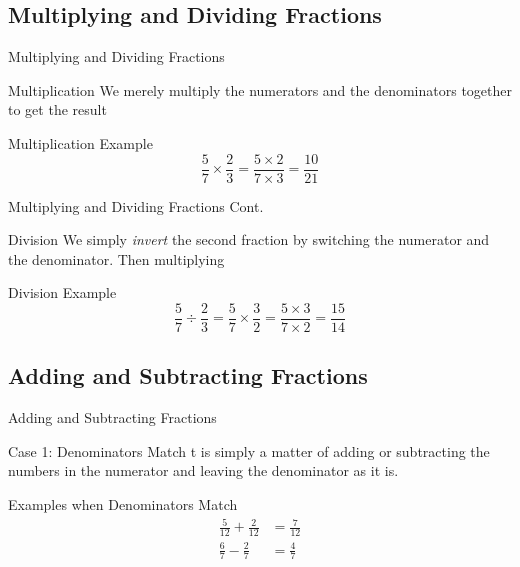\documentclass{beamer}
\begin{document}
\subsection{Multiplying and Dividing Fractions}

\begin{frame}{Multiplying and Dividing Fractions}

\begin{block}{Multiplication}
We merely multiply the numerators and the denominators together to get the result
\end{block}

  \begin{exampleblock}{Multiplication Example}
  $$\frac{5}{7}\times \frac{2}{3} = \frac{5\times 2}{7\times 3} = \frac{10}{21}$$
  \end{exampleblock}
\end{frame}

\begin{frame}{Multiplying and Dividing Fractions Cont.}

\begin{block}{Division}
We simply \textit{invert} the second fraction by switching the numerator and the denominator. Then multiplying
\end{block}

  \begin{exampleblock}{Division Example}
  $$\frac{5}{7}\div \frac{2}{3} = \frac{5}{7}\times \frac{3}{2} = \frac{5\times 3}{7\times 2} = \frac{15}{14}$$
  \end{exampleblock}
\end{frame}

\subsection{Adding and Subtracting Fractions}


\begin{frame}{Adding and Subtracting Fractions}
  \begin{block}{Case 1: Denominators Match}
    t is simply a matter of adding or subtracting the numbers in the numerator and leaving the denominator as it is.
  \end{block}
  \begin{exampleblock}{Examples when Denominators Match}
  \begin{align}
    \frac{5}{12} + \frac{2}{12} &= \frac{7}{12}\\
    \frac{6}{7} - \frac{2}{7} &= \frac{4}{7}
  \end{align}
  \end{exampleblock}

\end{frame}
\end{document}
